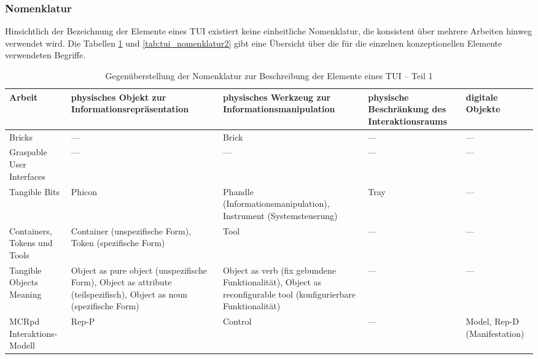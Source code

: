 \subsubsection{Nomenklatur}

Hinsichtlich der Bezeichnung der Elemente eines \gls{TUI} existiert keine einheitliche Nomenklatur, die konsistent über mehrere Arbeiten hinweg verwendet wird. Die Tabellen \ref{tab:tui_nomenklatur1} und \ref{tab:tui_nomenklatur2} gibt eine Übersicht über die für die einzelnen konzeptionellen Elemente verwendeten Begriffe.

\begin{table}[htbp]
		\centering
	\caption{Gegenüberstellung der Nomenklatur zur Beschreibung der Elemente eines TUI -- Teil 1}  
	\begin{tabular}{|p{2.2cm}||p{3cm}|p{3cm}|p{2cm}|p{2cm}|} \hline
			Arbeit & physisches Objekt zur Informations\-repräsentation & physisches Werkzeug zur Informations\-manipulation & physische Beschränkung des Interaktionsraums & digitale Objekte \\ \hline \hline
		
		Bricks & --- & Brick & --- & --- \\ \hline
		Graspable User Interfaces & --- & --- & --- & --- \\ \hline
		Tangible Bits & Phicon & Phandle (Informationsmanipulation), Instrument (Systemsteuerung) & Tray & --- \\ \hline
		Containers, Tokens und Tools & Container (unspezifische Form), Token (spezifische Form) & Tool & --- & --- \\ \hline
		Tangible Objects Meaning & Object as pure object (unspezifische Form), Object as attribute (teilspezifisch), Object as noun (spezifische Form) & Object as verb (fix gebundene Funktionalität), Object as reconfigurable tool (konfigurierbare Funktionalität) & --- & --- \\ \hline
		MCRpd Inter\-aktions-Modell &  Rep-P & Control & --- & Model, Rep-D (Manifestation)\\ \hline
	\end{tabular}

			\label{tab:tui_nomenklatur1}
\end{table}

